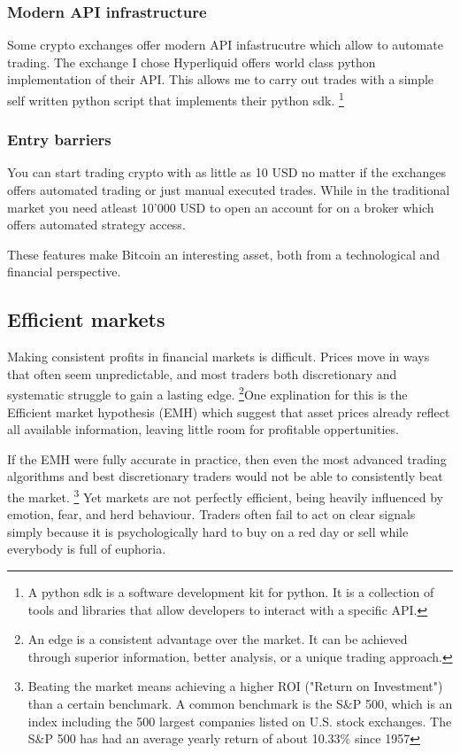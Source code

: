 \documentclass[12pt]{article}
\begin{document}
\subsubsection*{Modern API infrastructure}
Some crypto exchanges offer modern API infastrucutre which allow to automate trading. The exchange I chose Hyperliquid offers world class python implementation of their API. This allows me to carry out trades with a simple self written python script that implements their python sdk. \footnote{A python sdk is a software development kit for python. It is a collection of tools and libraries that allow developers to interact with a specific API.}



\subsubsection*{Entry barriers}
You can start trading crypto with as little as 10 USD no matter if the exchanges offers automated trading or just manual executed trades. While in the traditional market you need atleast 10'000 USD to open an account for on a broker which offers automated strategy access.



These features make Bitcoin an interesting asset, both from a technological and financial perspective.




\newpage
\subsection{Efficient markets}
Making consistent profits in financial markets is difficult. Prices move in ways that often seem unpredictable, and most traders both discretionary and systematic struggle to gain a lasting edge. \footnote{An edge is a consistent advantage over the market. It can be achieved through superior information, better analysis, or a unique trading approach.}One explination for this is the Efficient market hypothesis (EMH) which suggest that asset prices already reflect all available information, leaving little room for profitable oppertunities.






If the EMH were fully accurate in practice, then even the most advanced trading algorithms and best discretionary traders would not be able to consistently beat the market. \footnote{Beating the market means achieving a higher ROI ("Return on Investment") than a certain benchmark. A common benchmark is the S\&P 500, which is an index including the 500 largest companies listed on U.S. stock exchanges. The S\&P 500 has had an average yearly return of about 10.33\% since 1957} Yet markets are not perfectly efficient, being heavily influenced by emotion, fear, and herd behaviour. Traders often fail to act on clear signals simply because it is psychologically hard to buy on a red day or sell while everybody is full of euphoria.
\end{document}
